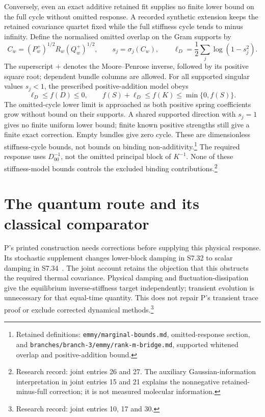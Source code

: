 \documentclass{article}
\begin{document}
Conversely, even an exact additive retained fit supplies no finite lower bound on the full cycle without omitted response. A recorded synthetic extension keeps the retained covariance quartet fixed while the full stiffness cycle tends to minus infinity. Define the normalised omitted overlap on the Gram supports by
\[
 C_w=(P_w^+)^{1/2}R_w(Q_w^+)^{1/2},\qquad s_j=\sigma_j(C_w),\qquad
 \ell_D=\frac12\sum_j\log(1-s_j^2).
\]
The superscript \(+\) denotes the Moore--Penrose inverse, followed by its positive square root; dependent bundle columns are allowed. For all supported singular values \(s_j<1\), the prescribed positive-addition model obeys
\[
 \ell_D\le f(D)\le0,\qquad f(S)+\ell_D\le f(K)\le\min\{0,f(S)\}.
\]
The omitted-cycle lower limit is approached as both positive spring coefficients grow without bound on their supports. A shared supported direction with \(s_j=1\) gives no finite uniform lower bound; finite known positive strengths still give a finite exact correction. Empty bundles give zero cycle. These are dimensionless stiffness-cycle bounds, not bounds on binding non-additivity.\footnote{Retained definitions: \texttt{emmy/marginal-bounds.md}, omitted-response section, and \texttt{branches/branch-3/emmy/rank-m-bridge.md}, supported whitened overlap and positive-addition bound.} The required response uses \(D_{00}^{-1}\), not the omitted principal block of \(K^{-1}\). None of these stiffness-model bounds controls the excluded binding contributions.\footnote{Research record: joint entries 26 and 27. The auxiliary Gaussian-information interpretation in joint entries 15 and 21 explains the nonnegative retained-minus-full correction; it is not measured molecular information.}

\section{The quantum route and its classical comparator}
P's printed construction needs corrections before supplying this physical response. Its stochastic supplement changes lower-block damping in S7.32 to scalar damping in S7.34~\cite{P}. The joint account retains the objection that this obstructs the required thermal covariance. Physical damping and fluctuation-dissipation give the equilibrium inverse-stiffness target independently; transient evolution is unnecessary for that equal-time quantity. This does not repair P's transient trace proof or exclude corrected dynamical methods.\footnote{Research record: joint entries 10, 17 and 30.}
\end{document}
